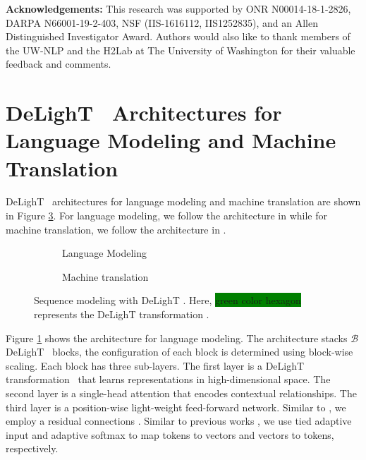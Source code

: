 \vspace{0.5mm}
\noindent \textbf{Acknowledgements:} This research was supported by ONR N00014-18-1-2826, DARPA N66001-19-2-403, NSF (IIS-1616112, IIS1252835), and an Allen Distinguished Investigator Award. Authors would also like to thank members of the UW-NLP and the H2Lab at The University of Washington for their valuable feedback and comments.

\small{


}

\clearpage

\appendix

\section{DeLighT ~Architectures for Language Modeling and Machine Translation}
\label{sec:appendix_enc_dec_arch}
DeLighT ~architectures for language modeling and machine translation are shown in Figure \ref{fig:appendix_arch}. For language modeling, we follow the architecture in \citet{baevski2018adaptive} while for machine translation, we follow the architecture in \citet{vaswani2017attention}. 

\begin{figure}[b!]
    \centering
    \begin{subfigure}[b]{0.38\columnwidth}
        \centering
        \resizebox{\columnwidth}{!}{
            \decattn
        }
        \caption{Language Modeling}
        \label{fig:appendix_arch_lm}
    \end{subfigure}
    \hfill
    \begin{subfigure}[b]{0.6\columnwidth}
         \centering
        \resizebox{\columnwidth}{!}{
            \encdecattn
        }
        \caption{Machine translation}
        \label{fig:appendix_arch_enc_dec}
    \end{subfigure}
    \caption{Sequence modeling with DeLighT . Here, \colorbox{green}{green color hexagon} represents the DeLighT transformation .}
    \label{fig:appendix_arch}
\end{figure}

\vspace{1mm}
 Figure \ref{fig:appendix_arch_lm} shows the architecture for language modeling. The architecture stacks $\mathcal{B}$ DeLighT ~blocks, the configuration of each block is determined using block-wise scaling. Each block has three sub-layers. The first layer is a DeLighT transformation ~that learns representations in high-dimensional space. The second layer is a single-head attention that encodes contextual relationships. The third layer is a position-wise light-weight feed-forward network. Similar to  \citet{vaswani2017attention}, we employ a residual connections \citep{he2016deep}. Similar to previous works \citep{baevski2018adaptive,dai2019transformer}, we use tied adaptive input \citep{baevski2018adaptive} and adaptive softmax \citep{grave2017efficient} to map tokens to vectors and vectors to tokens, respectively.

